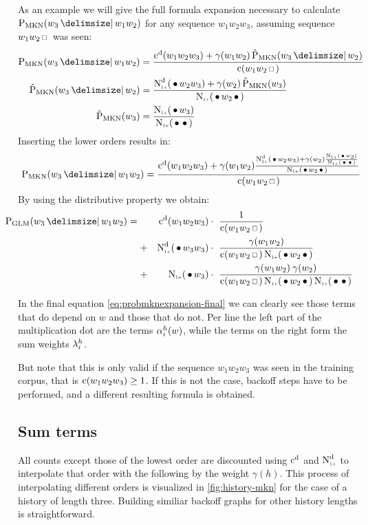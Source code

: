 As an example we will give the full formula expansion necessary to calculate
$\ProbMKN{w_3}{w_1 w_2}$ for any sequence $w_1 w_2 w_3$, assuming sequence
$w_1 w_2 \Skp$ was seen:
\begin{subequations}
  \begin{align}
    \ProbMKN {w_3}{w_1 w_2} &= \ProbMKNcab{\ProbMKN*{w_3}{w_2}} \\
    \ProbMKN*{w_3}{w_2}     &= \ProbMKNcb{\ProbMKN*{w_3}} \\
    \ProbMKN*{w_3}          &= \ProbMKNc
  \end{align}
\end{subequations}
Inserting the lower orders results in:
\begin{equation}
  \ProbMKN {w_3}{w_1 w_2} = \ProbMKNcab{\ProbMKNcb{\ProbMKNc}}
\end{equation}
By using the distributive property we obtain:
\begin{align}
  \label{eq:probmknexpansion-final}
  \hspace{-2.5em}\ProbGLM {w_3}{w_1 w_2} = {}
    & & \DiscountedCount (w_1 w_2 w_3)   & \cdot\ \frac{1}{\Count(w_1 w_2 \Skp)} \\
    &+& \DiscountedCount*(\WSkp w_3 w_3) & \cdot\ \frac{\gamma(w_1 w_2)}{\Count(w_1 w_2 \Skp) \ContCountIp(\WSkp w_2 \WSkp)} \nonumber \\
    &+& \ContCountIp(\WSkp w_3)          & \cdot\ \frac{\gamma(w_1 w_2) \: \gamma(w_2)}{\Count(w_1 w_2 \Skp) \ContCountIp(\WSkp w_2 \WSkp) \ContCountIp(\WSkp \WSkp)} \nonumber
\end{align}

In the final equation \cref{eq:probmknexpansion-final} we can clearly see
those terms that do depend on $w$ and those that do not.
Per line the left part of the multiplication dot are the terms $\alpha^h_i(w)$,
while the terms on the right form the sum weights $\lambda^h_i$.

But note that this is only valid if the sequence $w_1 w_2 w_3$ was seen in
the training corpus, that is $\operatorname{c}(w_1 w_2 w_3) \geq 1$.
If this is not the case, backoff steps have to be performed, and a different
resulting formula is obtained.

\subsection{Sum terms}

All counts except those of the lowest order are discounted using
$\DiscountedCount$ and $\DiscountedCount*$ to interpolate that order with the
following by the weight $\gamma(h)$.
This process of interpolating different orders is visualized in
\cref{fig:history-mkn} for the case of a history of length three.
Building similiar backoff graphs for other history lengths is straightforward.

